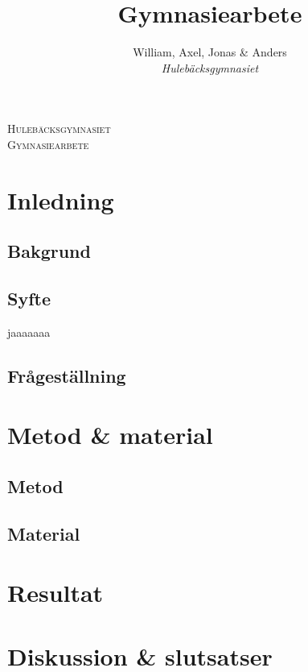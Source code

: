 \documentclass[]{article}
\title{Gymnasiearbete}
\author{William, Axel, Jonas \& Anders \\
\emph{Hulebäcksgymnasiet}}
\begin{document}
\begin{titlepage}
	\centering

	\vspace{4cm}
	{\scshape\LARGE Hulebäcksgymnasiet} \\
	\vspace{2cm}
	{\scshape\Large Gymnasiearbete}

\end{titlepage}

\section{Inledning}

\subsection{Bakgrund}

\subsection{Syfte}
jaaaaaaa
\subsection{Frågeställning}

\section{Metod \& material}

\subsection{Metod}

\subsection{Material}

\section{Resultat}

\section{Diskussion \& slutsatser}
\end{document}
